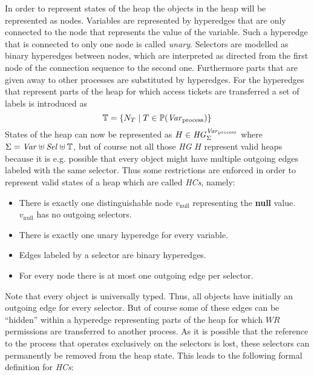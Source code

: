	In order to represent states of the heap the objects in the heap will be
	represented as nodes. Variables are represented by hyperedges that are
	only connected to the node that represents the value of the variable. Such
	a hyperedge that is connected to only one node is called \emph{unary}.
	Selectors are modelled as binary hyperedges between nodes, which are
	interpreted as directed from the first node of the connection sequence to
	the second one. Furthermore parts that are given away to other processes
	are substituted by hyperedges. For the hyperedges that represent parts of
	the heap for which access tickets are transferred a set of labels is
	introduced as
	\begin{equation*}
		\mathbb{T} = \{N_{T} \mid T\in\mathbb{P}(\mathit{Var}_{\text{process}})\}
	\end{equation*}
	States of the heap can now be represented as $H\in\mathit{HG}_{\Sigma}^{\mathit{Var}_{\text{process}}}$ where
	$\Sigma = \mathit{Var}\uplus\mathit{Sel}\uplus\mathbb{T}$, but of course not all those
	\emph{\ac{HG}} $H$ represent valid heaps because it is e.g. possible that
	every object might have multiple outgoing edges labeled with the same
	selector. Thus some restrictions are enforced in order to represent valid
	states of a heap which are called \emph{\acp{HC}}, namely:
	\begin{itemize}
		\item There is exactly one distinguishable node $v_{\text{null}}$
			representing the \textbf{null} value. $v_{\text{null}}$ has no
			outgoing selectors.
		\item There is exactly one unary hyperedge for every variable.
		\item Edges labeled by a selector are binary hyperedges.
		\item For every node there is at most one outgoing edge per
			selector.
	\end{itemize}
	Note that every object is universally typed. Thus, all objects have
	initially an outgoing edge for every selector. But of course some of these
	edges
	can be \enquote{hidden} within a hyperedge representing parts of the heap
	for which $\mathit{WR}$ permissions are transferred to another process. As
	it is possible that the reference to the process that operates exclusively
	on the selectors is lost, these selectors can permanently be removed from
	the heap state.
	This leads to the following formal definition for \emph{\acp{HC}}:
